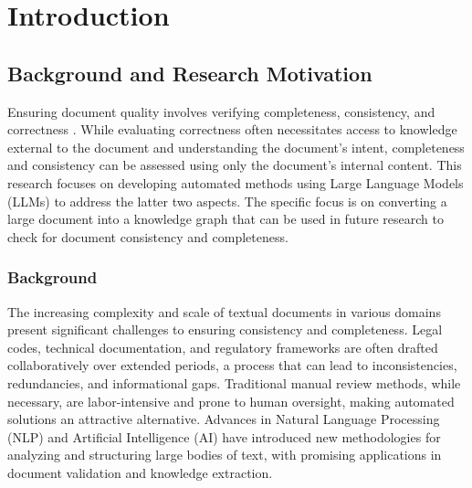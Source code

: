 \chapter{Introduction}
\label{chap:introduction}

\section{Background and Research Motivation}
Ensuring document quality involves verifying completeness, consistency, and correctness \parencite{RefWorks:RefID:10-zowghi2003interplay}. While evaluating correctness often necessitates access to knowledge external to the document and understanding the document's intent, completeness and consistency can be assessed using only the document's internal content. This research focuses on developing automated methods using Large Language Models (LLMs) to address the latter two aspects. The specific focus is on converting a large document into a knowledge graph that can be used in future research to check for document consistency and completeness.

\subsection{Background}
The increasing complexity and scale of textual documents in various domains present significant challenges to ensuring consistency and completeness. Legal codes, technical documentation, and regulatory frameworks are often drafted collaboratively over extended periods, a process that can lead to inconsistencies, redundancies, and informational gaps. Traditional manual review methods, while necessary, are labor-intensive and prone to human oversight, making automated solutions an attractive alternative. Advances in Natural Language Processing (NLP) and Artificial Intelligence (AI) have introduced new methodologies for analyzing and structuring large bodies of text, with promising applications in document validation and knowledge extraction.

